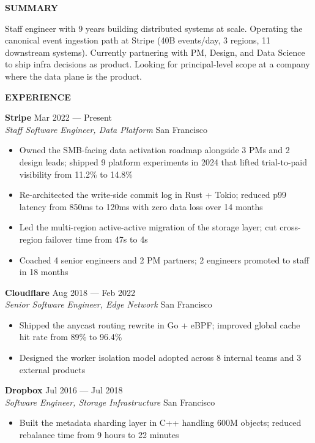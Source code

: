 \documentclass[letterpaper,10pt]{article}
\newcommand{\mainhead}[1]{%
  \vspace{12pt}
  {\bfseries\fontsize{11}{14}\selectfont\textcolor{modAccent}{\MakeUppercase{#1}}}
  \vspace{4pt}
}
\begin{document}
\begin{minipage}[t]{5.4in}

\mainhead{Summary}
Staff engineer with 9 years building distributed systems at scale. Operating the canonical event ingestion path at Stripe (40B events/day, 3 regions, 11 downstream systems). Currently partnering with PM, Design, and Data Science to ship infra decisions as product. Looking for principal-level scope at a company where the data plane is the product.

\mainhead{Experience}

\noindent\textbf{Stripe} \hfill \textcolor{modSec}{Mar 2022 --- Present} \\
\textit{Staff Software Engineer, Data Platform} \hfill \textcolor{modSec}{San Francisco}
\begin{itemize}
  \item Owned the SMB-facing data activation roadmap alongside 3 PMs and 2 design leads; shipped 9 platform experiments in 2024 that lifted trial-to-paid visibility from 11.2\% to 14.8\%
  \item Re-architected the write-side commit log in Rust + Tokio; reduced p99 latency from 850ms to 120ms with zero data loss over 14 months
  \item Led the multi-region active-active migration of the storage layer; cut cross-region failover time from 47s to 4s
  \item Coached 4 senior engineers and 2 PM partners; 2 engineers promoted to staff in 18 months
\end{itemize}

\vspace{4pt}
\noindent\textbf{Cloudflare} \hfill \textcolor{modSec}{Aug 2018 --- Feb 2022} \\
\textit{Senior Software Engineer, Edge Network} \hfill \textcolor{modSec}{San Francisco}
\begin{itemize}
  \item Shipped the anycast routing rewrite in Go + eBPF; improved global cache hit rate from 89\% to 96.4\%
  \item Designed the worker isolation model adopted across 8 internal teams and 3 external products
\end{itemize}

\vspace{4pt}
\noindent\textbf{Dropbox} \hfill \textcolor{modSec}{Jul 2016 --- Jul 2018} \\
\textit{Software Engineer, Storage Infrastructure} \hfill \textcolor{modSec}{San Francisco}
\begin{itemize}
  \item Built the metadata sharding layer in C++ handling 600M objects; reduced rebalance time from 9 hours to 22 minutes
\end{itemize}


\end{minipage}
\end{document}
